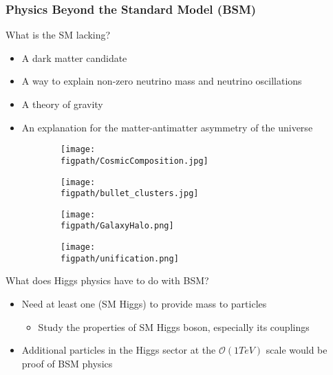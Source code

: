 \begin{frame}
	\frametitle{Physics Beyond the Standard Model (BSM)}
	\vspace*{-0.24cm}
	\begin{block}{What is the SM lacking?}
		\begin{itemize}
			\item A dark matter candidate
			\item A way to explain non-zero neutrino mass and neutrino oscillations
			\item A theory of gravity
			\item An explanation for the matter-antimatter asymmetry of the universe
		\end{itemize}
	\end{block}
	\vspace*{-0.15cm}
	\begin{figure}
		\label{fig:BSM}
		\centering
		\begin{subfigure}[t]{0.20\textwidth}
			\texttt{[image: \\figpath/CosmicComposition.jpg]}
			\label{fig:BSM1}
		\end{subfigure}
		\hfill
		\begin{subfigure}[t]{0.21\textwidth}
			\texttt{[image: \\figpath/bullet\_clusters.jpg]}
			\label{fig:BSM2}
		\end{subfigure}
		\hfill
		\begin{subfigure}[t]{0.20\textwidth}
			\texttt{[image: \\figpath/GalaxyHalo.png]}
			\label{fig:BSM3}
		\end{subfigure}
		\hfill
		\begin{subfigure}[t]{0.24\textwidth}
			\texttt{[image: \\figpath/unification.png]}
			\label{fig:BSM4}
		\end{subfigure}
	\end{figure}
	\vspace*{-0.30cm}
	\begin{block}{What does Higgs physics have to do with BSM?}
		\begin{itemize}
			\item Need at least one (SM Higgs) to provide mass to particles
			\begin{itemize}
				\item Study the properties of SM Higgs boson, especially its couplings
			\end{itemize}
			\item Additional particles in the Higgs sector at the $\mathcal{O}\left(1 TeV\right)$ scale would be proof of BSM physics

\end{itemize}
\end{block}
\end{frame}
